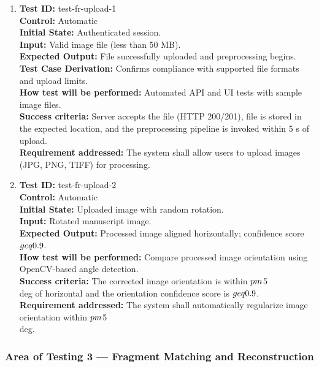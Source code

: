 \documentclass[12pt, titlepage]{article}
\begin{document}
\begin{enumerate}
\item
\textbf{Test ID:} test-fr-upload-1\\
\textbf{Control:} Automatic\\
\textbf{Initial State:} Authenticated session.\\
\textbf{Input:} Valid image file (less than 50 MB).\\
\textbf{Expected Output:} File successfully uploaded and preprocessing begins.\\
\textbf{Test Case Derivation:} Confirms compliance with supported file formats and upload limits.\\
\textbf{How test will be performed:} Automated API and UI tests with sample image files.\\
\textbf{Success criteria:} Server accepts the file (HTTP 200/201), file is stored in the expected location, and the preprocessing pipeline is invoked within 5 s of upload.\\
\textbf{Requirement addressed:} The system shall allow users to upload images (JPG, PNG, TIFF) for processing.\\

\item 
\textbf{Test ID:} test-fr-upload-2\\
\textbf{Control:} Automatic\\
\textbf{Initial State:} Uploaded image with random rotation.\\
\textbf{Input:} Rotated manuscript image.\\
\textbf{Expected Output:} Processed image aligned horizontally; confidence score $\\geq 0.9$.\\
\textbf{How test will be performed:} Compare processed image orientation using OpenCV-based angle detection.\\
\textbf{Success criteria:} The corrected image orientation is within $\\pm$5\\deg of horizontal and the orientation confidence score is $\\geq 0.9$.\\
\textbf{Requirement addressed:} The system shall automatically regularize image orientation within $\\pm$5\\deg.\\
\end{enumerate}

\subsubsection{Area of Testing 3 — Fragment Matching and Reconstruction}
\end{document}
